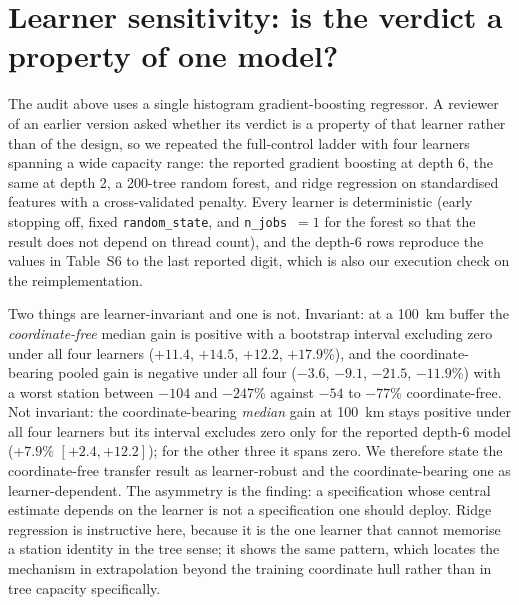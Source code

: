 \documentclass[11pt]{article}
\begin{document}
\section{Learner sensitivity: is the verdict a property of one model?}
The audit above uses a single histogram gradient-boosting regressor. A reviewer of an
earlier version asked whether its verdict is a property of that learner rather than of the
design, so we repeated the full-control ladder with four learners spanning a wide capacity
range: the reported gradient boosting at depth 6, the same at depth 2, a 200-tree random
forest, and ridge regression on standardised features with a cross-validated penalty.
Every learner is deterministic (early stopping off, fixed \texttt{random\_state}, and
\texttt{n\_jobs}~$=1$ for the forest so that the result does not depend on thread count),
and the depth-6 rows reproduce the values in Table~S6 to the last reported digit, which is
also our execution check on the reimplementation.

Two things are learner-invariant and one is not. Invariant: at a 100~km buffer the
\emph{coordinate-free} median gain is positive with a bootstrap interval excluding zero
under all four learners ($+11.4$, $+14.5$, $+12.2$, $+17.9$\%), and the coordinate-bearing
pooled gain is negative under all four ($-3.6$, $-9.1$, $-21.5$, $-11.9$\%) with a worst
station between $-104$ and $-247$\% against $-54$ to $-77$\% coordinate-free. Not
invariant: the coordinate-bearing \emph{median} gain at 100~km stays positive under all
four learners but its interval excludes zero only for the reported depth-6 model
($+7.9\%$ $[+2.4,+12.2]$); for the other three it spans zero. We therefore state the
coordinate-free transfer result as learner-robust and the coordinate-bearing one as
learner-dependent. The asymmetry is the finding: a specification whose central estimate
depends on the learner is not a specification one should deploy. Ridge regression is
instructive here, because it is the one learner that cannot memorise a station identity
in the tree sense; it shows the same pattern, which locates the mechanism in extrapolation
beyond the training coordinate hull rather than in tree capacity specifically.
\end{document}
